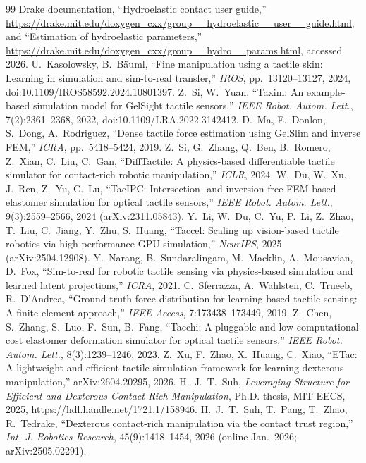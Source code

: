 \documentclass[10pt,twocolumn]{article}
\begin{document}
{\begin{thebibliography}{99}
 Drake documentation, ``Hydroelastic contact user guide,'' \url{https://drake.mit.edu/doxygen_cxx/group__hydroelastic__user__guide.html}, and ``Estimation of hydroelastic parameters,'' \url{https://drake.mit.edu/doxygen_cxx/group__hydro__params.html}, accessed 2026.
 U.~Kasolowsky, B.~B\"auml, ``Fine manipulation using a tactile skin: Learning in simulation and sim-to-real transfer,'' \emph{IROS}, pp.~13120--13127, 2024, doi:10.1109/IROS58592.2024.10801397.
 Z.~Si, W.~Yuan, ``Taxim: An example-based simulation model for GelSight tactile sensors,'' \emph{IEEE Robot. Autom. Lett.}, 7(2):2361--2368, 2022, doi:10.1109/LRA.2022.3142412.
 D.~Ma, E.~Donlon, S.~Dong, A.~Rodriguez, ``Dense tactile force estimation using GelSlim and inverse FEM,'' \emph{ICRA}, pp.~5418--5424, 2019.
 Z.~Si, G.~Zhang, Q.~Ben, B.~Romero, Z.~Xian, C.~Liu, C.~Gan, ``DiffTactile: A physics-based differentiable tactile simulator for contact-rich robotic manipulation,'' \emph{ICLR}, 2024.
 W.~Du, W.~Xu, J.~Ren, Z.~Yu, C.~Lu, ``TacIPC: Intersection- and inversion-free FEM-based elastomer simulation for optical tactile sensors,'' \emph{IEEE Robot. Autom. Lett.}, 9(3):2559--2566, 2024 (arXiv:2311.05843).
 Y.~Li, W.~Du, C.~Yu, P.~Li, Z.~Zhao, T.~Liu, C.~Jiang, Y.~Zhu, S.~Huang, ``Taccel: Scaling up vision-based tactile robotics via high-performance GPU simulation,'' \emph{NeurIPS}, 2025 (arXiv:2504.12908).
 Y.~Narang, B.~Sundaralingam, M.~Macklin, A.~Mousavian, D.~Fox, ``Sim-to-real for robotic tactile sensing via physics-based simulation and learned latent projections,'' \emph{ICRA}, 2021.
 C.~Sferrazza, A.~Wahlsten, C.~Trueeb, R.~D'Andrea, ``Ground truth force distribution for learning-based tactile sensing: A finite element approach,'' \emph{IEEE Access}, 7:173438--173449, 2019.
 Z.~Chen, S.~Zhang, S.~Luo, F.~Sun, B.~Fang, ``Tacchi: A pluggable and low computational cost elastomer deformation simulator for optical tactile sensors,'' \emph{IEEE Robot. Autom. Lett.}, 8(3):1239--1246, 2023.
 Z.~Xu, F.~Zhao, X.~Huang, C.~Xiao, ``ETac: A lightweight and efficient tactile simulation framework for learning dexterous manipulation,'' arXiv:2604.20295, 2026.
 H.~J.~T.~Suh, \emph{Leveraging Structure for Efficient and Dexterous Contact-Rich Manipulation}, Ph.D. thesis, MIT EECS, 2025, \url{https://hdl.handle.net/1721.1/158946}.
 H.~J.~T.~Suh, T.~Pang, T.~Zhao, R.~Tedrake, ``Dexterous contact-rich manipulation via the contact trust region,'' \emph{Int. J. Robotics Research}, 45(9):1418--1454, 2026 (online Jan.~2026; arXiv:2505.02291).

\end{thebibliography}}
\end{document}
